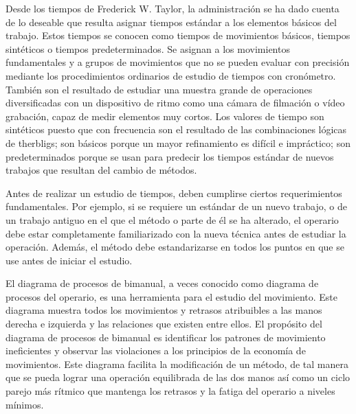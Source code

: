     
    
    Desde los tiempos de Frederick W. Taylor, la administración se ha dado cuenta de lo deseable que resulta asignar tiempos estándar a los elementos básicos del trabajo. Estos tiempos se conocen como tiempos de movimientos básicos, tiempos sintéticos o tiempos predeterminados. Se asignan a los movimientos fundamentales y a grupos de movimientos que no se pueden 
    evaluar con precisión mediante los procedimientos ordinarios de estudio de tiempos con cronómetro. 
    También son el resultado de estudiar una muestra grande de operaciones diversificadas con un dispositivo de ritmo como una cámara de filmación o vídeo grabación, capaz de medir elementos muy 
    cortos. Los valores de tiempo son sintéticos puesto que con frecuencia son el resultado de las combinaciones lógicas de therbligs; son básicos porque un mayor refinamiento es difícil e impráctico; son predeterminados porque se usan para predecir los tiempos estándar de nuevos trabajos que resultan del cambio de métodos.
    
    Antes de realizar un estudio de tiempos, deben cumplirse ciertos requerimientos fundamentales. Por ejemplo, si se requiere un estándar de un nuevo trabajo, o de un trabajo antiguo en el que el método o parte de él se ha alterado, el operario debe estar completamente familiarizado con la nueva técnica antes de estudiar la operación. Además, el método debe estandarizarse en todos los puntos en que se use antes de iniciar el estudio. 
    
    El diagrama de procesos de bimanual, a veces conocido como diagrama de procesos del operario, es una herramienta para el estudio del movimiento. Este diagrama muestra todos los movimientos y retrasos atribuibles a las manos derecha e izquierda y las relaciones que existen entre ellos. El propósito del diagrama de procesos de bimanual es identificar los patrones de movimiento ineficientes y observar las violaciones a los principios de la economía de movimientos. Este diagrama facilita la modificación de un método, de tal manera que se pueda lograr una operación equilibrada de las dos manos así como un ciclo parejo más rítmico que mantenga los retrasos y la fatiga del operario a niveles mínimos.
    
